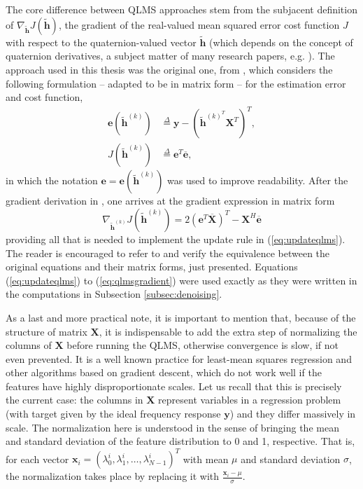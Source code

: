 The core difference between QLMS approaches stem from the subjacent definition of $\nabla_{\mathbf{\widetilde{h}}} J(\mathbf{\widetilde{h}})$, the gradient of the real-valued mean squared error cost function $J$ with respect to the quaternion-valued vector $\mathbf{\widetilde{h}}$ (which depends on the concept of quaternion derivatives, a subject matter of many research papers, e.g. \cite{xu2015enabling,jahanchahi2012gradient}). The approach used in this thesis was the original one, from \cite{took2008quaternion}, which considers the following formulation -- adapted to be in matrix form -- for the estimation error and cost function,
\begin{align}
\label{eq:errorqlms}
\mathbf{e}(\mathbf{\widetilde{h}}^{(k)}) &\overset{\Delta}{=}
\mathbf{y} -
\left( \mathbf{\widetilde{h}}^{{(k)}^T} \mathbf{X}^T \right)^T, \\
J(\mathbf{\widetilde{h}}^{(k)}) &\overset{\Delta}{=}
\mathbf{e}^T
\overline{\mathbf{e}},
\end{align}
in which the notation $\mathbf{e} = \mathbf{e}(\mathbf{\widetilde{h}}^{(k)})$ was used to improve readability. After the gradient derivation in \cite{took2008quaternion}, one arrives at the gradient expression in matrix form
\begin{equation}
\label{eq:qlmsgradient}
\nabla_{\mathbf{\widetilde{h}}^{(k)}} J(\mathbf{\widetilde{h}}^{(k)}) =
2 \left(
\mathbf{e}^T \overline{\mathbf{X}}
\right)^T - \mathbf{X}^H \overline{\mathbf{e}}
\end{equation}
providing all that is needed to implement the update rule in (\ref{eq:updateqlms}). The reader is encouraged to refer to \cite{took2008quaternion} and verify the equivalence between the original equations and their matrix forms, just presented. Equations (\ref{eq:updateqlms}) to (\ref{eq:qlmsgradient}) were used exactly as they were written in the computations in Subsection \ref{subsec:denoising}.

As a last and more practical note, it is important to mention that, because of the structure of matrix $\mathbf{X}$, it is indispensable to add the extra step of normalizing the columns of $\mathbf{X}$ before running the QLMS, otherwise convergence is slow, if not even prevented. It is a well known practice for least-mean squares regression and other algorithms based on gradient descent, which do not work well if the features have highly disproportionate scales. Let us recall that this is precisely the current case: the columns in $\mathbf{X}$ represent variables in a regression problem (with target given by the ideal frequency response $\mathbf{y}$) and they differ massively in scale. The normalization here is understood in the sense of bringing the mean and standard deviation of the feature distribution to 0 and 1, respective. That is, for each vector $\mathbf{x}_i = (\lambda^i_0, \lambda^i_1, \dots, \lambda^i_{N-1})^T$ with mean $\mu$ and standard deviation $\sigma$, the normalization takes place by replacing it with $\frac{\mathbf{x}_i - \mu}{\sigma}$.

